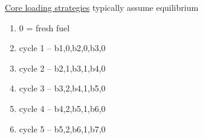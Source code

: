 \documentclass[aspectratio=1610,pdftex,dvipsnames,compress,xcolor={dvipsnames}]{beamer}
\begin{document}
\begin{frame}{\href{http://www.iaea.org/inis/collection/NCLCollectionStore/_Public/27/002/27002175.pdf}{Core loading strategies} typically assume equilibrium}
    \begin{enumerate}[topsep=0pt,itemsep=15pt,leftmargin=*,label=(\arabic*)]
        \item[]0 = fresh fuel
        \item[]cycle 1 -- b{1,0},b{2,0},b{3,0}
        \item[]cycle 2 -- b{2,1},b{3,1},b{4,0}
        \item[]cycle 3 -- b{3,2},b{4,1},b{5,0}
        \item[]cycle 4 -- b{4,2},b{5,1},b{6,0}
        \item[]cycle 5 -- b{5,2},b{6,1},b{7,0}
    \end{enumerate}
\end{frame}
\end{document}
